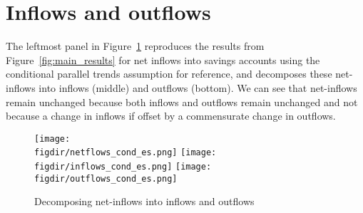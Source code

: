 \section{Inflows and outflows}%
\label{sec:inflows_and_outflows}

The leftmost panel in Figure~\ref{fig:in_out_results} reproduces the results from
Figure~\ref{fig:main_results} for net inflows into savings accounts using the
conditional parallel trends assumption for reference, and decomposes these
net-inflows into inflows (middle) and outflows (bottom). We can see that
net-inflows remain unchanged because both inflows and outflows remain
unchanged and not because a change in inflows if offset by a commensurate
change in outflows.

\begin{figure}[H]
    \centering
    \caption{Decomposing net-inflows into inflows and outflows}%
    \label{fig:in_out_results}
    \texttt{[image: \\figdir/netflows\_cond\_es.png]}
    \texttt{[image: \\figdir/inflows\_cond\_es.png]}
    \texttt{[image: \\figdir/outflows\_cond\_es.png]}
\end{figure}

